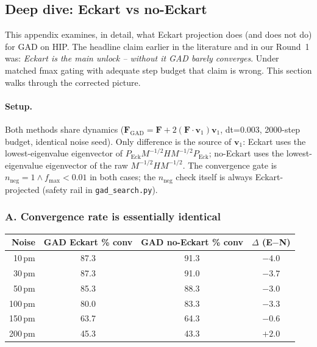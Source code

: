 \documentclass[11pt]{article}
\begin{document}
\clearpage
\subsection{Deep dive: Eckart vs no-Eckart}
\label{sec:eckart_appendix}

This appendix examines, in detail, what Eckart projection does (and
does not do) for GAD on HIP. The headline claim earlier in the
literature and in our Round~1 was: \emph{Eckart is the main unlock --
without it GAD barely converges}. Under matched fmax gating with
adequate step budget that claim is wrong. This section walks through
the corrected picture.

\paragraph{Setup.} Both methods share dynamics
($\mathbf{F}_{\text{GAD}} = \mathbf{F} + 2(\mathbf{F}\cdot\mathbf{v}_1)\mathbf{v}_1$,
dt=0.003, 2000-step budget, identical noise seed). Only difference is the source
of $\mathbf{v}_1$: Eckart uses the lowest-eigenvalue eigenvector of
$P_{\text{Eck}} M^{-1/2} H M^{-1/2} P_{\text{Eck}}$; no-Eckart uses the
lowest-eigenvalue eigenvector of the raw $M^{-1/2} H M^{-1/2}$.
The convergence gate is $n_{\text{neg}}{=}1 \wedge f_{\max}{<}0.01$
in both cases; the $n_{\text{neg}}$ check itself is always Eckart-projected
(safety rail in \texttt{gad\_search.py}).

\subsubsection*{A. Convergence rate is essentially identical}

\begin{center}
\begin{tabular}{r|cc|c}
\toprule
Noise & GAD Eckart \% conv & GAD no-Eckart \% conv & $\Delta$ (E$-$N) \\
\midrule
10\,pm  & 87.3 & 91.3 & $-4.0$ \\
30\,pm  & 87.3 & 91.0 & $-3.7$ \\
50\,pm  & 85.3 & 88.3 & $-3.0$ \\
100\,pm & 80.0 & 83.3 & $-3.3$ \\
150\,pm & 63.7 & 64.3 & $-0.6$ \\
200\,pm & 45.3 & 43.3 & $+2.0$ \\
\bottomrule
\end{tabular}
\end{center}
\end{document}
